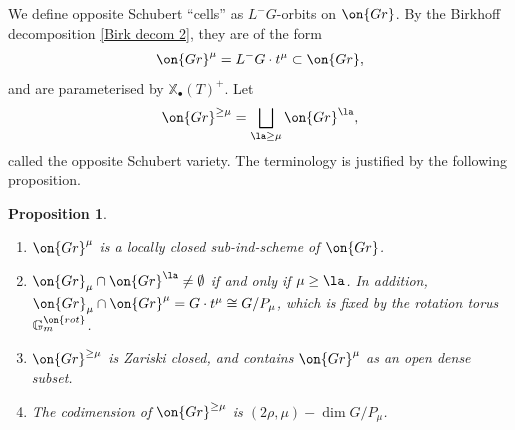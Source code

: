 \documentclass[]{pcmi}
\theoremstyle{plain}
\newtheorem{prop}[equation]{Proposition}
\theoremstyle{remark}
\theoremstyle{definition}
\newcommand{\bG}{{\mathbb G}}
\newcommand{\Gr}{{\on{Gr}}}
\def\xcoch{\mathbb{X}_\bullet}
\begin{document}
We define opposite Schubert ``cells'' as $L^-G$-orbits on $\Gr$. By the Birkhoff decomposition \eqref{Birk decom 2}, they are of the form
\[\Gr^\mu=L^-G\cdot t^\mu \subset \Gr,\]
and are parameterised by $\xcoch(T)^+$. 
Let 
$$\Gr^{\geq \mu}=\bigsqcup_{\la\geq \mu}\Gr^\la,$$ called the opposite Schubert variety. The terminology is justified by the following proposition.
\begin{prop}\label{geom of opp Sch}~
\begin{enumerate}
\item $\Gr^\mu$ is a locally closed sub-ind-scheme of $\Gr$.

\item $\Gr_\mu\cap \Gr^\la\neq \emptyset$ if and only if $\mu\geq \la$. In addition, $\Gr_\mu\cap \Gr^\mu= G\cdot t^\mu\cong G/P_\mu$, which is fixed by the rotation torus $\bG_m^{\on{rot}}$.

\item $\Gr^{\geq \mu}$ is Zariski closed, and contains $\Gr^\mu$ as an open dense subset.

\item The codimension of $\Gr^{\geq \mu}$ is $(2\rho,\mu)-\dim G/P_\mu$.
\end{enumerate}
\end{prop}
\end{document}
